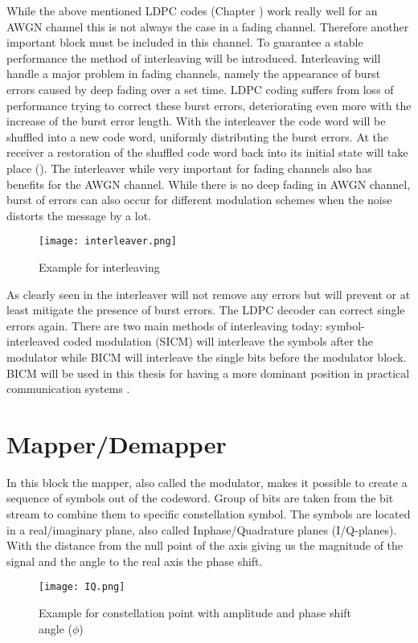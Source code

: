 While the above mentioned \gls{LDPC} codes (Chapter ) work really well for an AWGN channel this is not always the case in a fading channel. Therefore another important block must be included in this channel. To guarantee a stable performance the method of interleaving will be introduced. Interleaving will handle a major problem in fading channels, namely the appearance of burst errors caused by deep fading over a set time. \gls{LDPC} coding suffers from loss of performance trying to correct these burst errors, deteriorating even more with the increase of the burst error length. With the interleaver the code word will be shuffled into a new code word, uniformly distributing the burst errors. At the receiver a restoration of the shuffled code word back into its initial state will take place (). The interleaver while very important for fading channels also has benefits for the AWGN channel. While there is no deep fading in AWGN channel, burst of errors can also occur for different modulation schemes when the noise distorts the message by a lot.
\begin{figure}[!htb]
	\centering
	\texttt{[image: interleaver.png]}
	\caption{Example for interleaving}
	\label{fig:interleaver}
\end{figure}

As clearly seen in  the interleaver will not remove any errors but will prevent or at least mitigate the presence of burst errors. The \gls{LDPC} decoder can correct single errors again. There are two main methods of interleaving today: symbol-interleaved coded modulation (SICM) will interleave the symbols after the modulator while \gls{BICM} will interleave the single bits before the modulator block. \gls{BICM} will be used in this thesis for having a more dominant position in practical communication systems \cite{Fabregas03}.

\clearpage

\section{Mapper/Demapper}
\label{sec:mapper}

In this block the mapper, also called the modulator, makes it possible to create a sequence of symbols out of the codeword. Group of bits are taken from the bit stream to combine them to specific constellation symbol. The symbols are located in a real/imaginary plane, also called Inphase/Quadrature planes (I/Q-planes). With the distance from the null point of the axis giving us the magnitude of the signal and the angle to the real axis the phase shift. 
\begin{figure}[!htb]
	\centering
	\texttt{[image: IQ.png]}
	\caption{Example for constellation point with amplitude and phase shift angle ($\phi$)}
	\label{fig:IQ}
\end{figure}

